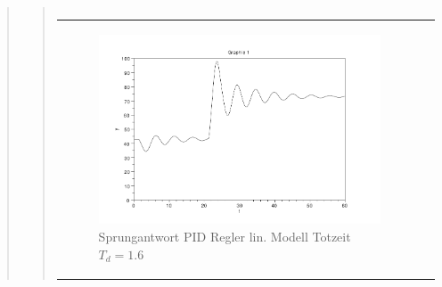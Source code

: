 \begin{quote}
\begin{quote}
\begin{center}
\begin{tabular}{ll}
                \end{tabular}
            \end{center}

            \begin{center}
                \begin{tabular}{ll}
                
                \hspace{-2.5cm}
                    \begin{minipage}{0.6\textwidth}
                        \begin{figure}[H]
                            \includegraphics[scale=0.4, trim = 0cm 0cm 0cm
                            0cm, clip]
                            {./Bilder/4_1_Td_16}
                              \caption{Sprungantwort PID Regler lin. Modell Totzeit $T_d = 1.6$}
                        \end{figure}
                    \end{minipage}
                    

\end{tabular}
\end{center}
\end{quote}
\end{quote}
